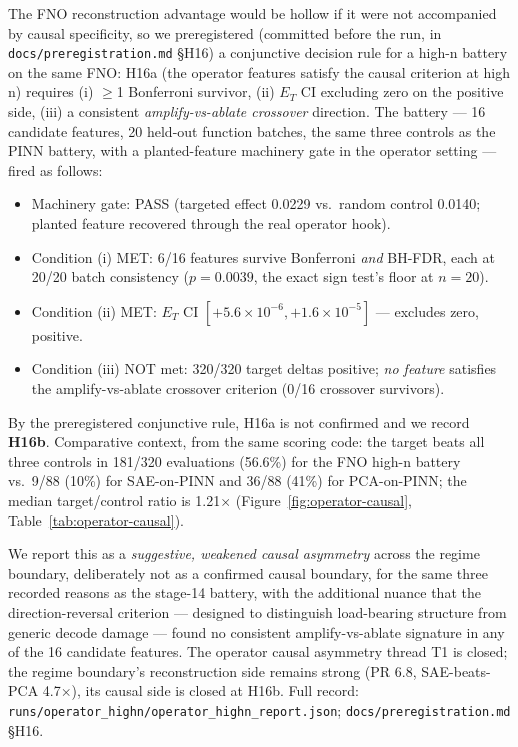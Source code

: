 \documentclass{article}
\newcommand{\ET}{E_T}
\begin{document}
The FNO reconstruction advantage would be hollow if it were not
accompanied by causal specificity, so we preregistered (committed before
the run, in \texttt{docs/preregistration.md} \S H16) a conjunctive
decision rule for a high-n battery on the same FNO: H16a (the operator
features satisfy the causal criterion at high n) requires (i) $\ge$1 Bonferroni
survivor, (ii) $E_T$ CI excluding zero on the positive side, (iii) a
consistent \emph{amplify-vs-ablate crossover} direction. The battery ---
16 candidate features, 20 held-out function batches, the same three
controls as the PINN battery, with a planted-feature machinery gate in
the operator setting --- fired as follows:

\begin{itemize}
  \item Machinery gate: PASS (targeted effect 0.0229 vs.\ random control
        0.0140; planted feature recovered through the real operator hook).
  \item Condition (i) MET: 6/16 features survive Bonferroni \emph{and}
        BH-FDR, each at 20/20 batch consistency ($p = 0.0039$, the exact
        sign test's floor at $n{=}20$).
  \item Condition (ii) MET: $\ET$ CI $[+5.6\times10^{-6}, +1.6\times10^{-5}]$
        --- excludes zero, positive.
  \item Condition (iii) NOT met: 320/320 target deltas positive; \emph{no
        feature} satisfies the amplify-vs-ablate crossover criterion
        (0/16 crossover survivors).
\end{itemize}

By the preregistered conjunctive rule, H16a is not confirmed and we
record \textbf{H16b}. Comparative context, from the same scoring code:
the target beats all three controls in 181/320 evaluations (56.6\%) for
the FNO high-n battery vs.\ 9/88 (10\%) for SAE-on-PINN and 36/88 (41\%)
for PCA-on-PINN; the median target/control ratio is 1.21$\times$
(Figure~\ref{fig:operator-causal}, Table~\ref{tab:operator-causal}).

We report this as a \emph{suggestive, weakened causal asymmetry} across
the regime boundary, deliberately not as a confirmed causal boundary, for
the same three recorded reasons as the stage-14 battery, with the
additional nuance that the direction-reversal criterion --- designed to
distinguish load-bearing structure from generic decode damage --- found no
consistent amplify-vs-ablate signature in any of the 16 candidate
features. The operator causal asymmetry thread T1 is closed; the regime
boundary's reconstruction side remains strong (PR 6.8, SAE-beats-PCA
4.7$\times$), its causal side is closed at H16b. Full record:
\texttt{runs/operator\_highn/operator\_highn\_report.json};
\texttt{docs/preregistration.md} \S H16.
\end{document}

